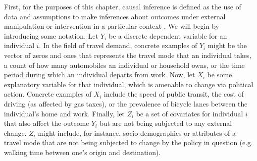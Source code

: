 First, for the purposes of this chapter, causal inference is defined as the use of data and assumptions to make inferences about outcomes under external manipulation or intervention in a particular context \citep{dawid_2010_beware}. We will begin by introducing some notation. Let $Y_i$ be a discrete dependent variable for an individual $i$. In the field of travel demand, concrete examples of $Y_i$ might be the vector of zeros and ones that represents the travel mode that an individual takes, a count of how many automobiles an individual or household owns, or the time period during which an individual departs from work. Now, let $X_i$ be some explanatory variable for that individual, which is amenable to change via political action. Concrete examples of $X_i$ include the speed of public transit, the cost of driving (as affected by gas taxes), or the prevalence of bicycle lanes between the individual's home and work. Finally, let $Z_i$ be a set of covariates for individual $i$ that also affect the outcome $Y_i$ but are not being subjected to any external change. $Z_i$ might include, for instance, socio-demographics or attributes of a travel mode that are not being subjected to change by the policy in question (e.g. walking time between one's origin and destination).

